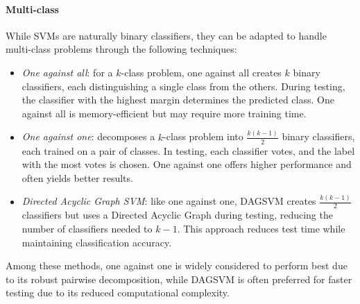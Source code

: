 \paragraph*{Multi-class}
While SVMs are naturally binary classifiers, they can be adapted to handle multi-class problems through the following techniques:
\begin{itemize}
    \item \textit{One against all}: for a $k$-class problem, one against all creates $k$ binary classifiers, each distinguishing a single class from the others.
        During testing, the classifier with the highest margin determines the predicted class.
        One against all is memory-efficient but may require more training time.
    \item \textit{One against one}: decomposes a $k$-class problem into  $\frac{k(k-1)}{2}$ binary classifiers, each trained on a pair of classes. 
        In testing, each classifier votes, and the label with the most votes is chosen. 
        One against one offers higher performance and often yields better results.
    \item \textit{Directed Acyclic Graph SVM}: like one against one, DAGSVM creates $\frac{k(k-1)}{2}$ classifiers but uses a Directed Acyclic Graph during testing, reducing the number of classifiers needed to $k-1$. 
        This approach reduces test time while maintaining classification accuracy.
\end{itemize}
Among these methods, one against one is widely considered to perform best due to its robust pairwise decomposition, while DAGSVM is often preferred for faster testing due to its reduced computational complexity.